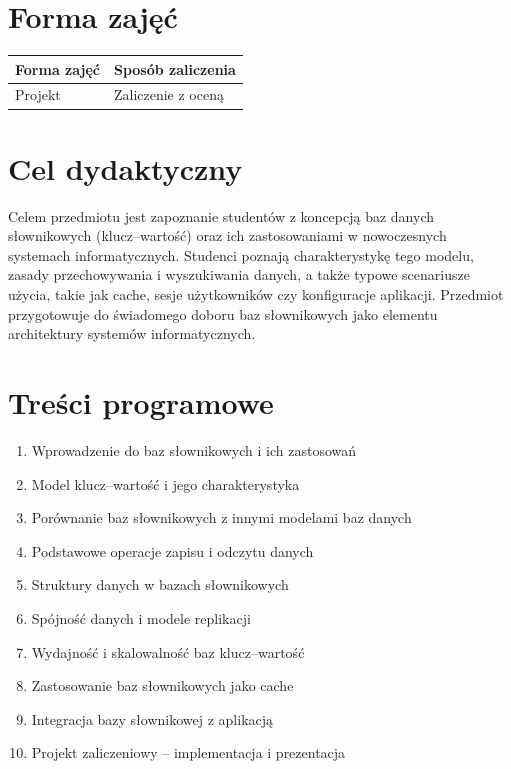 \documentclass[12pt, a4paper]{article}
\begin{document}
\section{Forma zajęć}

\begin{tabular}{ll}
  \hline
  \textbf{Forma zajęć} & \textbf{Sposób zaliczenia} \\
  \hline
  Projekt & Zaliczenie z oceną \\
  \hline
\end{tabular}

\section{Cel dydaktyczny}

Celem przedmiotu jest zapoznanie studentów z koncepcją baz danych słownikowych (klucz–wartość) oraz ich zastosowaniami w nowoczesnych systemach informatycznych. Studenci poznają charakterystykę tego modelu, zasady przechowywania i wyszukiwania danych, a także typowe scenariusze użycia, takie jak cache, sesje użytkowników czy konfiguracje aplikacji. Przedmiot przygotowuje do świadomego doboru baz słownikowych jako elementu architektury systemów informatycznych.

\section{Treści programowe}

\begin{enumerate}
  \item Wprowadzenie do baz słownikowych i ich zastosowań
  \item Model klucz–wartość i jego charakterystyka
  \item Porównanie baz słownikowych z innymi modelami baz danych
  \item Podstawowe operacje zapisu i odczytu danych
  \item Struktury danych w bazach słownikowych
  \item Spójność danych i modele replikacji
  \item Wydajność i skalowalność baz klucz–wartość
  \item Zastosowanie baz słownikowych jako cache
  \item Integracja bazy słownikowej z aplikacją
  \item Projekt zaliczeniowy – implementacja i prezentacja
\end{enumerate}
\end{document}
